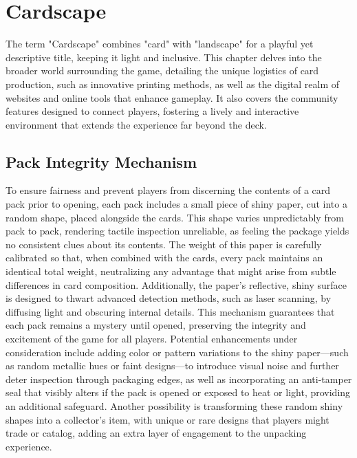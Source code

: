 \chapter{Cardscape}

The term "Cardscape" combines "card" with "landscape" for a playful yet descriptive title, keeping it light and inclusive. This chapter delves into the broader world surrounding the game, detailing the unique logistics of card production, such as innovative printing methods, as well as the digital realm of websites and online tools that enhance gameplay. It also covers the community features designed to connect players, fostering a lively and interactive environment that extends the experience far beyond the deck.








\section{Pack Integrity Mechanism}

To ensure fairness and prevent players from discerning the contents of a card pack prior to opening, each pack includes a small piece of shiny paper, cut into a random shape, placed alongside the cards. This shape varies unpredictably from pack to pack, rendering tactile inspection unreliable, as feeling the package yields no consistent clues about its contents. The weight of this paper is carefully calibrated so that, when combined with the cards, every pack maintains an identical total weight, neutralizing any advantage that might arise from subtle differences in card composition. Additionally, the paper’s reflective, shiny surface is designed to thwart advanced detection methods, such as laser scanning, by diffusing light and obscuring internal details. This mechanism guarantees that each pack remains a mystery until opened, preserving the integrity and excitement of the game for all players. Potential enhancements under consideration include adding color or pattern variations to the shiny paper---such as random metallic hues or faint designs---to introduce visual noise and further deter inspection through packaging edges, as well as incorporating an anti-tamper seal that visibly alters if the pack is opened or exposed to heat or light, providing an additional safeguard. Another possibility is transforming these random shiny shapes into a collector’s item, with unique or rare designs that players might trade or catalog, adding an extra layer of engagement to the unpacking experience.







